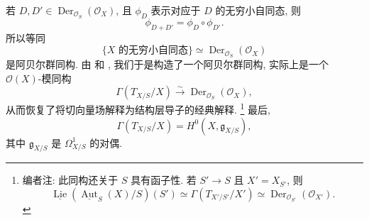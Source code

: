 若 \(D,D'\in\operatorname{Der}_{\mathcal O_S}(\mathcal O_X)\),
且 \(\phi_D\) 表示对应于 \(D\) 的无穷小自同态, 则
\[
  \phi_{D+D'}=\phi_D\circ\phi_{D'}.
\]
所以等同
\[
  \{X\text{ 的无穷小自同态}\}
  \simeq\operatorname{Der}_{\mathcal O_S}(\mathcal O_X)
\]
是阿贝尔群同构.
由  和
,
我们于是构造了一个阿贝尔群同构, 实际上是一个 \(\mathcal O(X)\)-模同构
\[
  \Gamma(T_{X/S}/X)
  \xrightarrow{\sim}\operatorname{Der}_{\mathcal O_S}(\mathcal O_X),
\]
从而恢复了将切向量场解释为结构层导子的经典解释.
\footnote{编者注: 此同构还关于 \(S\) 具有函子性.
若 \(S'\to S\) 且 \(X'=X_{S'}\), 则
\[
  \underline{\operatorname{Lie}}
    (\underline{\operatorname{Aut}}_S(X)/S)(S')
  \simeq\Gamma(T_{X'/S'}/X')
  \simeq\operatorname{Der}_{\mathcal O_{S'}}(\mathcal O_{X'}).
\]}
最后,
\[
  \Gamma(T_{X/S}/X)=H^0(X,\mathfrak g_{X/S}),
\]
其中 \(\mathfrak g_{X/S}\) 是 \(\Omega^1_{X/S}\) 的对偶.


